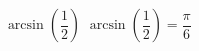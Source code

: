  {$\arcsin \left( \dfrac{1}{2} \right)$ }
{ $\arcsin \left( \dfrac{1}{2} \right) = \dfrac{\pi}{6}$}
